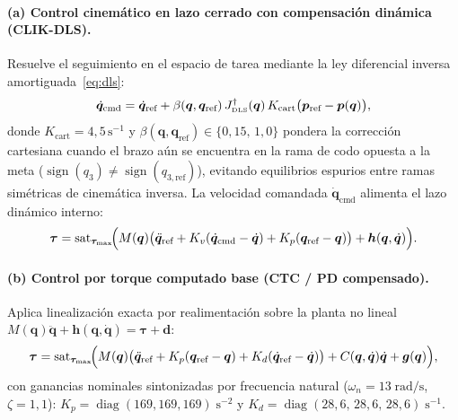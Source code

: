 \documentclass[11pt,a4paper]{article}
\newcommand{\qdot}{\dot{\bm{q}}}
\newcommand{\qddot}{\ddot{\bm{q}}}
\newcommand{\Jdls}{J^{\dagger}_{\text{\tiny DLS}}}
\begin{document}
\paragraph{(a) Control cinemático en lazo cerrado con compensación dinámica (CLIK-DLS).}
Resuelve el seguimiento en el espacio de tarea mediante la ley diferencial inversa amortiguada~\eqref{eq:dls}:
\begin{equation}\label{eq:clik}
\qdot_{\text{cmd}}=\qdot_{\text{ref}}+\beta(\bm{q},\bm{q}_{\text{ref}})\,\Jdls(\bm{q})\,K_{\text{cart}}\bigl(\bm{p}_{\text{ref}}-\bm{p}(\bm{q})\bigr),
\end{equation}
donde $K_{\text{cart}}=4{,}5\,\text{s}^{-1}$ y $\beta(\bm{q},\bm{q}_{\text{ref}})\in\{0{,}15,\,1{,}0\}$ pondera la corrección cartesiana cuando el brazo aún se encuentra en la rama de codo opuesta a la meta ($\operatorname{sign}(q_{3})\ne\operatorname{sign}(q_{3,\text{ref}})$), evitando equilibrios espurios entre ramas simétricas de cinemática inversa. La velocidad comandada $\qdot_{\text{cmd}}$ alimenta el lazo dinámico interno:
\begin{equation}\label{eq:clik_tau}
\bm{\tau}=\operatorname{sat}_{\bm{\tau}_{\max}}\!\Bigl(M(\bm{q})\bigl(\qddot_{\text{ref}}+K_{v}(\qdot_{\text{cmd}}-\qdot)+K_{p}(\bm{q}_{\text{ref}}-\bm{q})\bigr)+\bm{h}(\bm{q},\qdot)\Bigr).
\end{equation}

\paragraph{(b) Control por torque computado base (CTC / PD compensado).}
Aplica linealización exacta por realimentación sobre la planta no lineal $M(\bm{q})\qddot+\bm{h}(\bm{q},\qdot)=\bm{\tau}+\bm{d}$:
\begin{equation}\label{eq:ctc}
\bm{\tau}=\operatorname{sat}_{\bm{\tau}_{\max}}\!\Bigl(M(\bm{q})\bigl(\qddot_{\text{ref}}+K_{p}(\bm{q}_{\text{ref}}-\bm{q})+K_{d}(\qdot_{\text{ref}}-\qdot)\bigr)+C(\bm{q},\qdot)\qdot+\bm{g}(\bm{q})\Bigr),
\end{equation}
con ganancias nominales sintonizadas por frecuencia natural ($\omega_{n}=13\;\text{rad/s}$, $\zeta=1{,}1$): $K_{p}=\operatorname{diag}(169,169,169)\;\text{s}^{-2}$ y $K_{d}=\operatorname{diag}(28{,}6,\,28{,}6,\,28{,}6)\;\text{s}^{-1}$.
\end{document}
